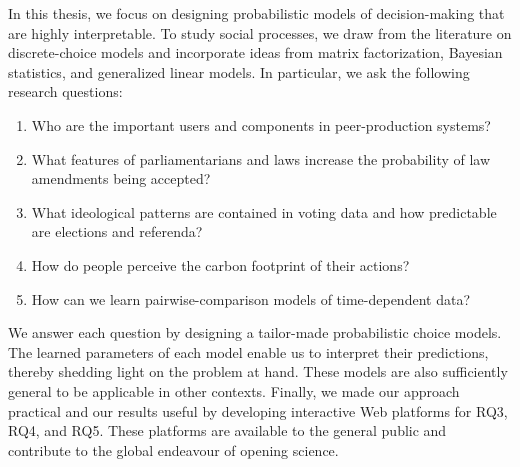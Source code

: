 In this thesis, we focus on designing probabilistic models of decision-making that are highly interpretable.
To study social processes, we draw from the literature on discrete-choice models and incorporate ideas from matrix factorization, Bayesian statistics, and generalized linear models.
In particular, we ask the following research questions:
\begin{enumerate}[
		leftmargin=1.5cm,
		topsep=0cm,
		parsep=0.0pt,
		itemsep=1.5pt,
		label=\textbf{RQ\arabic*}
	]
	\item Who are the important users and components in peer-production systems?
	\item What features of parliamentarians and laws increase the probability of law amendments being accepted?
	\item What ideological patterns are contained in voting data and how predictable are elections and referenda?
	\item How do people perceive the carbon footprint of their actions?
	\item How can we learn pairwise-comparison models of time-dependent data?
\end{enumerate}
We answer each question by designing a tailor-made probabilistic choice models.
The learned parameters of each model enable us to interpret their predictions, thereby shedding light on the problem at hand.
These models are also sufficiently general to be applicable in other contexts.
Finally, we made our approach practical and our results useful by developing interactive Web platforms for RQ3, RQ4, and RQ5.
These platforms are available to the general public and contribute to the global endeavour of opening science.
